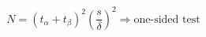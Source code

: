 

\[
N = (t_{\alpha} + t_{\beta})^2 \left( \frac{s}{\delta} \right)^2 \Rightarrow \mbox{one-sided test}
\]


